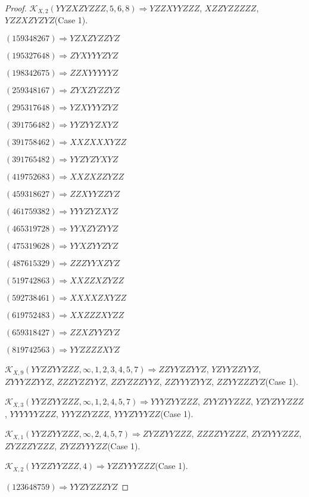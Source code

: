 \documentclass[12pt]{article}
\theoremstyle{plain}
\theoremstyle{definition}
\theoremstyle{remark}
\newcommand{\fancy}[1]{\mathcal{#1}}
\def\K{\fancy{K}}
\begin{document}
\begin{proof}
	$\K_{X,2}(YYZXZYZZZ,5, 6, 8)\Rightarrow $$YZZXYYZZZ$, $XZZYZZZZZ$, $YZZXZYZYZ$(Case 1).
	
	
	
	$(1 5 9 3 4 8 2 6 7)\Rightarrow YZXZYZZYZ$
	
	$(1 9 5 3 2 7 6 4 8)\Rightarrow ZYXYYYZYZ$
	
	$(1 9 8 3 4 2 6 7 5)\Rightarrow ZZXYYYYYZ$
	
	$(2 5 9 3 4 8 1 6 7)\Rightarrow ZYXZYZZYZ$
	
	$(2 9 5 3 1 7 6 4 8)\Rightarrow YZXYYYZYZ$
	
	$(3 9 1 7 5 6 4 8 2)\Rightarrow YYZYYZXYZ$
	
	$(3 9 1 7 5 8 4 6 2)\Rightarrow XXZXXXYZZ$
	
	$(3 9 1 7 6 5 4 8 2)\Rightarrow YYZYZYXYZ$
	
	$(4 1 9 7 5 2 6 8 3)\Rightarrow XXZXZZYZZ$
	
	$(4 5 9 3 1 8 6 2 7)\Rightarrow ZZXYYZZYZ$
	
	$(4 6 1 7 5 9 3 8 2)\Rightarrow YYYZYZXYZ$
	
	$(4 6 5 3 1 9 7 2 8)\Rightarrow YYXZYZYYZ$
	
	$(4 7 5 3 1 9 6 2 8)\Rightarrow YYXZYYZYZ$
	
	$(4 8 7 6 1 5 3 2 9)\Rightarrow ZZZYYXZYZ$
	
	$(5 1 9 7 4 2 8 6 3)\Rightarrow XXZZXZYZZ$
	
	$(5 9 2 7 3 8 4 6 1)\Rightarrow XXXXZXYZZ$
	
	$(6 1 9 7 5 2 4 8 3)\Rightarrow XXZZZXYZZ$
	
	$(6 5 9 3 1 8 4 2 7)\Rightarrow ZZXZYYZYZ$
	
	$(8 1 9 7 4 2 5 6 3)\Rightarrow YYZZZZXYZ$
	
	
	
	$\K_{X,9}(YYZZYYZZZ,\infty,1, 2, 3, 4, 5, 7)\Rightarrow $$ZZYYZZYYZ$, $YZYYZZYYZ$, $ZYYYZZYYZ$, $ZZZYZZYYZ$, $ZZYZZZYYZ$, $ZZYYYZYYZ$, $ZZYYZZZYZ$(Case 1).
	
	$\K_{X,3}(YYZZYYZZZ,\infty,1, 2, 4, 5, 7)\Rightarrow $$YYYZYYZZZ$, $ZYYZYYZZZ$, $YZYZYYZZZ$, $YYYYYYZZZ$, $YYYZZYZZZ$, $YYYZYYYZZ$(Case 1).
	
	$\K_{X,1}(YYZZYYZZZ,\infty,2, 4, 5, 7)\Rightarrow $$ZYZZYYZZZ$, $ZZZZYYZZZ$, $ZYZYYYZZZ$, $ZYZZZYZZZ$, $ZYZZYYYZZ$(Case 1).
	
	$\K_{X,2}(YYZZYYZZZ,4)\Rightarrow $$YZZYYYZZZ$(Case 1).
	
	
	
	$(1 2 3 6 4 8 7 5 9)\Rightarrow YYZYZZZYZ$
	

\end{proof}
\end{document}
